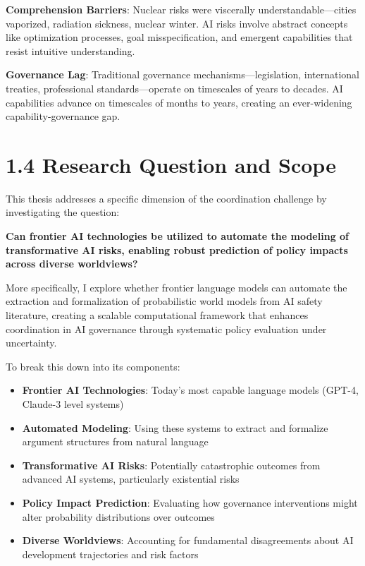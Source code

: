 \documentclass[
  11pt,
  letterpaper,
  openany]{book}
\providecommand{\tightlist}{%
  \setlength{\itemsep}{0pt}\setlength{\parskip}{0pt}}
\begin{document}
\textbf{Comprehension Barriers}: Nuclear risks were viscerally
understandable---cities vaporized, radiation sickness, nuclear winter.
AI risks involve abstract concepts like optimization processes, goal
misspecification, and emergent capabilities that resist intuitive
understanding.

\textbf{Governance Lag}: Traditional governance
mechanisms---legislation, international treaties, professional
standards---operate on timescales of years to decades. AI capabilities
advance on timescales of months to years, creating an ever-widening
capability-governance gap.

\section{1.4 Research Question and
Scope}\label{research-question-and-scope}

This thesis addresses a specific dimension of the coordination challenge
by investigating the question:

\textbf{Can frontier AI technologies be utilized to automate the
modeling of transformative AI risks, enabling robust prediction of
policy impacts across diverse worldviews?}

More specifically, I explore whether frontier language models can
automate the extraction and formalization of probabilistic world models
from AI safety literature, creating a scalable computational framework
that enhances coordination in AI governance through systematic policy
evaluation under uncertainty.

To break this down into its components:

\begin{itemize}
\tightlist
\item
  \textbf{Frontier AI Technologies}: Today's most capable language
  models (GPT-4, Claude-3 level systems)
\item
  \textbf{Automated Modeling}: Using these systems to extract and
  formalize argument structures from natural language
\item
  \textbf{Transformative AI Risks}: Potentially catastrophic outcomes
  from advanced AI systems, particularly existential risks
\item
  \textbf{Policy Impact Prediction}: Evaluating how governance
  interventions might alter probability distributions over outcomes
\item
  \textbf{Diverse Worldviews}: Accounting for fundamental disagreements
  about AI development trajectories and risk factors
\end{itemize}
\end{document}
